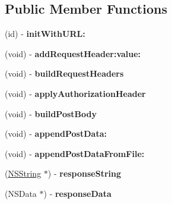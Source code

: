 \subsection*{Public Member Functions}
\begin{DoxyCompactItemize}
\item 
\hypertarget{interface_a_s_i_h_t_t_p_request_aec75eeba26544a9da35e795011fe4a42}{
(id) -\/ {\bfseries initWithURL:}}
\label{interface_a_s_i_h_t_t_p_request_aec75eeba26544a9da35e795011fe4a42}

\item 
\hypertarget{interface_a_s_i_h_t_t_p_request_a0e969f091acb07bbbe6dbc9295260d64}{
(void) -\/ {\bfseries addRequestHeader:value:}}
\label{interface_a_s_i_h_t_t_p_request_a0e969f091acb07bbbe6dbc9295260d64}

\item 
\hypertarget{interface_a_s_i_h_t_t_p_request_a84fd344945df932bb1499066a6136b44}{
(void) -\/ {\bfseries buildRequestHeaders}}
\label{interface_a_s_i_h_t_t_p_request_a84fd344945df932bb1499066a6136b44}

\item 
\hypertarget{interface_a_s_i_h_t_t_p_request_a585f10faa599a2d9c27a5013653901e8}{
(void) -\/ {\bfseries applyAuthorizationHeader}}
\label{interface_a_s_i_h_t_t_p_request_a585f10faa599a2d9c27a5013653901e8}

\item 
\hypertarget{interface_a_s_i_h_t_t_p_request_a03e252428a7cee3ce6c67a33d93adfb4}{
(void) -\/ {\bfseries buildPostBody}}
\label{interface_a_s_i_h_t_t_p_request_a03e252428a7cee3ce6c67a33d93adfb4}

\item 
\hypertarget{interface_a_s_i_h_t_t_p_request_ad74dabdd3aeb97b1cfcf95a05fea9bcc}{
(void) -\/ {\bfseries appendPostData:}}
\label{interface_a_s_i_h_t_t_p_request_ad74dabdd3aeb97b1cfcf95a05fea9bcc}

\item 
\hypertarget{interface_a_s_i_h_t_t_p_request_a5496e23e12b1ec7d6d02a78aa6777d10}{
(void) -\/ {\bfseries appendPostDataFromFile:}}
\label{interface_a_s_i_h_t_t_p_request_a5496e23e12b1ec7d6d02a78aa6777d10}

\item 
\hypertarget{interface_a_s_i_h_t_t_p_request_ab07f5cdd4072ee67681bea30d8714fdd}{
(\hyperlink{class_n_s_string}{NSString} $\ast$) -\/ {\bfseries responseString}}
\label{interface_a_s_i_h_t_t_p_request_ab07f5cdd4072ee67681bea30d8714fdd}

\item 
\hypertarget{interface_a_s_i_h_t_t_p_request_a69800aea50919ec446f44d91b7ac9e83}{
(NSData $\ast$) -\/ {\bfseries responseData}}
\label{interface_a_s_i_h_t_t_p_request_a69800aea50919ec446f44d91b7ac9e83}


\end{DoxyCompactItemize}
